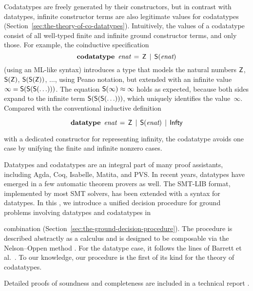 Codatatypes are freely generated by their constructors, but in contrast with datatypes,
infinit\-e constructor terms are also legitimate values for codatatypes
(Section~\ref{sec:the-theory-of-co-datatypes}). Intuitively, the
values of a codatatype consist of all well-typed finite and infinite ground
constructor
terms, and only those. For example, the coinductive specification
%
\[\textbf{codatatype}~\,\textit{enat} \,=\, \textsf{Z} \,\mid\, \textsf{S}(\textit{enat})\]
%
(using an ML-like syntax) introduces a type that
models the natural numbers $\textsf{Z}$, $\textsf{S}(\textsf{Z})$, $\textsf{S}(\textsf{S}(\textsf{Z}))$, $\ldots$\afterLdots{},
using Peano notation, but extended with an
infinite value $\infty = \textsf{S}(\textsf{S}(\textsf{S}(\ldots)))$.
The equation $\textsf{S}(\infty) \approx \infty$ holds as expected,
because both sides expand to the infinite term
$\textsf{S}(\textsf{S}(\textsf{S}(\ldots)))$, which uniquely identifies the
value~$\infty$.
Compared with the conventional inductive definition
\begin{rep}
\[\textbf{datatype}~\,\textit{enat} \,=\, \textsf{Z} \,\mid\, \textsf{S}(\textit{enat}) \,\mid\, \textsf{Infty}\]
\end{rep}
with a dedicated constructor for representing infinity, the codatatype avoids
one case by unifying the finite and infinite nonzero cases.

\nopagebreak

Datatypes and codatatypes are an integral part of many proof assistants,
including Agda, Coq, Isabelle, Matita, and PVS. In recent years, datatypes
have emerged in a few automatic theorem provers as well. The SMT-LIB
format, implemented by most SMT
solvers, has been extended with a syntax for datatypes.
In this \thewordpaper, we introduce a unified decision procedure for ground
problems involving datatypes and codatatypes in
\begin{conf}\goodbreak\noindent\end{conf}%
combination (Section~\ref{sec:the-ground-decision-procedure}).
The procedure is described abstractly as a calculus and is
designed to be composable via the Nelson--Oppen method \cite{nelson-oppen-1979}.
For the datatype case, it follows the lines of Barrett et al.\ \cite{barrett-et-al-2007}.
To our knowledge, our procedure is the first of its kind for the theory of
codatatypes.
\begin{conf}
Detailed proofs of soundness and completeness are included in a technical report
\cite{our-report}.
\end{conf}%

